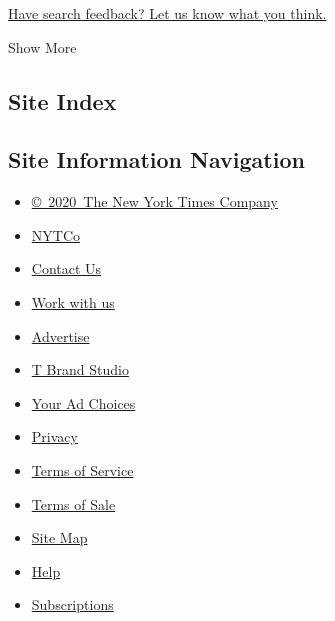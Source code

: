 \href{http://nyt.qualtrics.com/jfe/form/SV_ehZpyzWtbwO9HVj?v=a}{Have
search feedback? Let us know what you think.}

Show More

\hypertarget{site-index}{%
\subsection{Site Index}\label{site-index}}

\hypertarget{site-information-navigation}{%
\subsection{Site Information
Navigation}\label{site-information-navigation}}

\begin{itemize}
\tightlist
\item
  \href{https://help.nytimes.com/hc/en-us/articles/115014792127-Copyright-notice}{©~2020~The
  New York Times Company}
\end{itemize}

\begin{itemize}
\tightlist
\item
  \href{https://www.nytco.com/}{NYTCo}
\item
  \href{https://help.nytimes.com/hc/en-us/articles/115015385887-Contact-Us}{Contact
  Us}
\item
  \href{https://www.nytco.com/careers/}{Work with us}
\item
  \href{https://nytmediakit.com/}{Advertise}
\item
  \href{http://www.tbrandstudio.com/}{T Brand Studio}
\item
  \href{https://www.nytimes.com/privacy/cookie-policy\#how-do-i-manage-trackers}{Your
  Ad Choices}
\item
  \href{https://www.nytimes.com/privacy}{Privacy}
\item
  \href{https://help.nytimes.com/hc/en-us/articles/115014893428-Terms-of-service}{Terms
  of Service}
\item
  \href{https://help.nytimes.com/hc/en-us/articles/115014893968-Terms-of-sale}{Terms
  of Sale}
\item
  \href{https://spiderbites.nytimes.com}{Site Map}
\item
  \href{https://help.nytimes.com/hc/en-us}{Help}
\item
  \href{https://www.nytimes.com/subscription?campaignId=37WXW}{Subscriptions}
\end{itemize}
